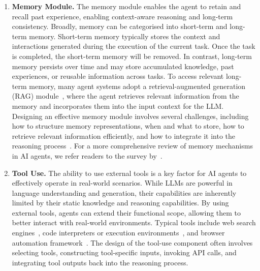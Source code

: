 \documentclass[]{selfevolagent}
\theoremstyle{plain}
\theoremstyle{definition}
\theoremstyle{remark}
\begin{document}
\begin{enumerate}[label=(\arabic*)]
\item \textbf{Memory Module.} The memory module enables the agent to retain and recall past experience, enabling context-aware reasoning and long-term consistency. Broadly, memory can be categorised into short-term and long-term memory. Short-term memory typically stores the context and interactions generated during the execution of the current task. Once the task is completed, the short-term memory will be removed. %
In contrast, long-term memory persists over time and may store accumulated knowledge, past experiences, or reusable information across tasks. To access relevant long-term memory, many agent systems adopt a retrieval-augmented generation (RAG) module~\citep{zhang2024survey}, where the agent retrieves relevant information from the memory and incorporates them into the input context for the LLM. Designing an effective memory module involves several challenges, including how to structure memory representations, when and what to store, how to retrieve relevant information efficiently, and how to integrate it into the reasoning process~\cite{zeng2024structural}. For a more comprehensive review of memory mechanisms in AI agents, we refer readers to the survey by~\cite{zhang2024survey}. 
    
\item \textbf{Tool Use.} The ability to use external tools is a key factor for AI agents to effectively operate in real-world scenarios. While LLMs are powerful in language understanding and generation, their capabilities are inherently limited by their static knowledge and reasoning capabilities. By using external tools, agents can extend their functional scope, allowing them to better interact with real-world environments. Typical tools include web search engines~\citep{li2025webthinker}, code interpreters or execution environments~\citep{islam2024mapcoder}, and browser automation framework~\citep{browser_use2024}. The design of the tool-use component often involves selecting tools, constructing tool-specific inputs, invoking API calls, and integrating tool outputs back into the reasoning process.

\end{enumerate}
\end{document}

